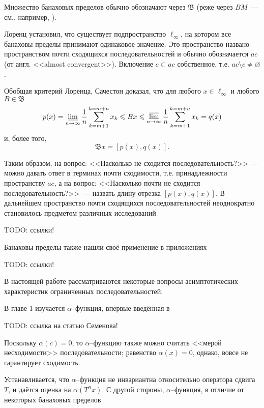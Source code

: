 Множество банаховых пределов обычно обозначают через $\mathfrak{B}$
(реже через $BM$~--- см., например, \cite{alekhno2012superposition,alekhno2015banach}).

Лоренц \cite{lorentz1948contribution} установил, что существует подпространство $\ell_\infty$,
на котором все банаховы пределы принимают одинаковое значение.
Это пространство названо пространством почти сходящихся последовательностей и обычно обозначается $ac$
(от англ. <<almost convergent>>).
Включение $c \subset ac$ собственное, т.е. $ac \setminus c \neq \varnothing$.


Обобщая критерий Лоренца, Сачестон \cite{sucheston1967banach} доказал, что для любого $x\in\ell_\infty$
и любого $B\in\mathfrak{B}$
\begin{equation*}
	p(x) = \varliminf_{n\to\infty} \frac{1}{n} \sum_{k=m+1}^{k=m+n} x_k
	\leq
	Bx
	\leq
	\varlimsup_{n\to\infty} \frac{1}{n} \sum_{k=m+1}^{k=m+n} x_k
	= q(x)
\end{equation*}
и, более того,
\begin{equation*}
	\mathfrak{B}x = [p(x), q(x)]
	.
\end{equation*}

Таким образом, на вопрос: <<Насколько не сходится последовательность?>>~---
можно давать ответ в терминах почти сходимости, т.е. принадлежности пространству $ac$,
а на вопрос: <<Насколько почти не сходится последовательность?>>~---
назвать длину отрезка $[p(x), q(x)]$.
В дальнейшем пространство почти сходящихся последовательностей неоднократно становилось предметом
различных исследований

TODO: ссылки!

Банаховы пределы также нашли своё применение в приложениях

TODO: ссылки!


В настоящей работе рассматриваются некоторые вопросы асимптотических характеристик ограниченных последовательностей.

В главе 1
изучается $\alpha$--функция, впервые введённая в

TODO: ссылка на статью Семенова!

Поскольку $\alpha(c)=0$,
то $\alpha$--функцию также можно считать <<мерой несходимости>> последовательности;
равенство $\alpha(x) = 0$, однако, вовсе не гарантирует сходимость.

Устанавливается, что $\alpha$--функция не инвариантна относительно оператора сдвига $T$,
и даётся оценка на $\alpha(T^n x)$.
С другой стороны, $\alpha$--функция, в отличие от некоторых банаховых пределов
\cite{Semenov2010invariant}

